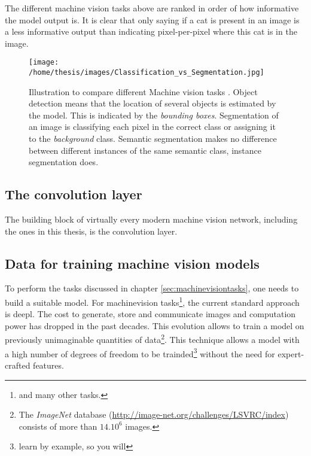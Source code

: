 \par{
    The different machine vision tasks above are ranked in order of how informative the model output is.
    It is clear that only saying if a cat is present in an image is a less informative output than indicating pixel-per-pixel where this cat is in the image.
}
\begin{SCfigure}[][h!]
    \centering
    \texttt{[image: /home/thesis/images/Classification\_vs\_Segmentation.jpg]}
    \caption{Illustration to compare different Machine vision tasks \cite{SemTorch76:online}. 
    Object detection means that the location of several objects is estimated by the model. This is indicated by the \textit{bounding boxes}.
    Segmentation of an image is classifying each pixel in the correct class or assigning it to the \textit{background} class.
    Semantic segmentation makes no difference between different instances of the same semantic class, instance segmentation does.
    \label{fig:machinevisiontasks}}
\end{SCfigure}


\subsection{The convolution layer}

The building block of virtually every modern machine vision network, including the ones in this thesis, is the convolution layer.


\subsection{Data for training machine vision models}
\par{
    To perform the tasks discussed in chapter \ref{sec:machinevisiontasks}, one needs to build a suitable model.
    For \Gls{machinevision} tasks\footnote{and many other tasks.}, the current standard approach is \Gls{deepl}.
    The cost to generate, store and communicate images and computation power has dropped in the past decades.
    This evolution allows to train a model  on previously unimaginable quantities of data\footnote{The \textit{ImageNet} database (\url{http://image-net.org/challenges/LSVRC/index}) consists of more than $14.10^6$ images.}.
    This technique allows a model with a high number of degrees of freedom to be trainded\footnote{learn by example, so you will} without the need for expert-crafted features. 
}
